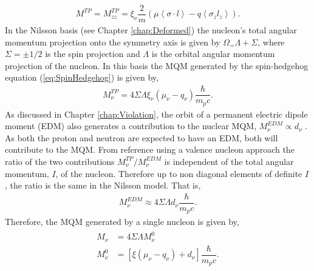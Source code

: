\documentclass[10pt,a4paper, twoside, openright]{report}
\begin{document}
\begin{align}
M^{TP}  = M_{zz}^{TP} = \xi_{\nu}\dfrac{2}{m}\left(\mu\left<\sigma\cdot l \right> - q\left<\sigma_z l_z\right>\right) .
\end{align}
In the Nilsson basis (see Chapter \ref{chap:Deformed}) the nucleon's total angular momentum projection onto the symmetry axis is given by $\Omega_ = \Lambda + \Sigma$, where $\Sigma = \pm 1/2$ is the spin projection and $\Lambda$ is the orbital angular momentum projection of the nucleon. In this basis the MQM  generated by the spin-hedgehog equation (\ref{eq:SpinHedgehog}) is given by,
\begin{align}
M^{TP}_{\nu} = 4\Sigma\Lambda\xi_{\nu}\left(\mu_{\nu} - q_{\nu}\right)\dfrac{\hbar}{m_p c}.
\end{align} 
As discussed in Chapter \ref{chap:Violation}, the orbit of a permanent electric dipole moment (EDM) also  generates a contribution to the nuclear MQM, $M_{\nu}^{EDM} \propto d_{\nu}$ \cite{Khriplovich1976}. As both the proton and neutron are expected to have an EDM, both will contribute to the MQM. From reference \cite{Flambaum2014} using a valence nucleon approach the ratio of the two contributions $M^{TP}_{\nu}/M_{\nu}^{EDM}$ is independent of the total angular momentum, $I$, of the nucleon. Therefore up to non diagonal elements of definite $I$, the ratio is the same in the Nilsson model. That is,
\begin{align}
M_{\nu}^{EDM} \approx  4\Sigma\Lambda d_{\nu}\dfrac{\hbar}{m_p c}.
\end{align}
Therefore, the MQM generated by a single nucleon is given by,
\begin{align}\label{eq:NuclearMQM} 
\begin{split}
M_{\nu} &= 4\Sigma\Lambda M_{\nu}^0 \\ 
M_{\nu}^0 &= \left[\xi\left(\mu_{\nu} - q_{\nu}\right) + d_{\nu}\right]\dfrac{\hbar}{m_p c}. 
\end{split}
\end{align}
\end{document}
